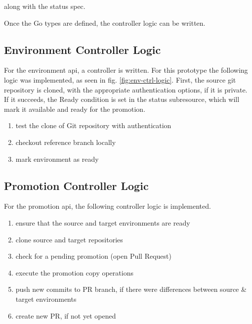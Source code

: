 

along with the status spec.



Once the Go types are defined,
the controller logic can be written.

\subsection*{Environment Controller Logic}

For the environment api,
a controller is written.
For this prototype the following logic was implemented,
as seen in fig. \ref{fig:env-ctrl-logic}.
First, the source git repository is cloned,
with the appropriate authentication options, if it is private.
If it succeeds, the Ready condition is set in the status subresource,
which will mark it available and ready for the promotion.

\begin{enumerate}
	\item test the clone of Git repository with authentication
	\item checkout reference branch locally
	\item mark environment as ready
\end{enumerate}

\subsection*{Promotion Controller Logic}

For the promotion api,
the following controller logic is implemented.

\begin{enumerate}
	\item ensure that the source and target environments are ready
	\item clone source and target repositories
	\item check for a pending promotion (open Pull Request)
	\item execute the promotion copy operations
	\item push new commits to PR branch, if there were differences between source \& target environments
	\item create new PR, if not yet opened
\end{enumerate}
















